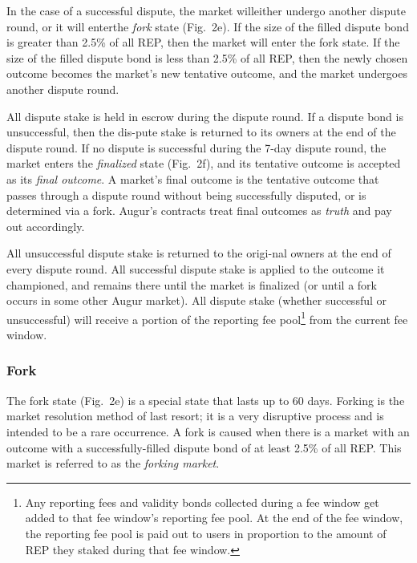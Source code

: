 \documentclass[12pt,floatfix,reprint,nofootinbib,amsmath,amssymb,epsfig,pre,floats,letterpaper,groupedaffiliation]{revtex4-1}
\theoremstyle{definition}
\theoremstyle{definition}
\begin{document}
In the case of a successful dispute, the market will\linebreak either undergo another dispute round, or it will enter\linebreak the \textit{fork} state (Fig.~2e). If the size of the filled dispute bond is greater than 2.5\% of all REP, then the market will enter the fork state. If the size of the filled dispute bond is less than 2.5\% of all REP, then the newly chosen outcome becomes the market's new tentative outcome, and the market undergoes another dispute round.

All dispute stake is held in escrow during the dispute round. If a dispute bond is unsuccessful, then the dis-\linebreak pute stake is returned to its owners at the end of the dispute round. If no dispute is successful during the 7-day dispute round, the market enters the \textit{finalized} state (Fig.~2f), and its tentative outcome is accepted as its \textit{fi\linebreak nal outcome}. A market's final outcome is the tentative outcome that passes through a dispute round without being successfully disputed, or is determined via a fork. Augur's contracts treat final outcomes as \textit{truth} and pay out accordingly.

All unsuccessful dispute stake is returned to the origi-\linebreak nal owners at the end of every dispute round. All success\-ful dispute stake is applied to the outcome it championed, and remains there until the market is finalized (or until a fork occurs in some other Augur market). All dispute stake (whether successful or unsuccessful) will receive a portion of the reporting fee pool\footnote{Any reporting fees and validity bonds collected during a fee window get added to that fee window's reporting fee pool. At the end of the fee window, the reporting fee pool is paid out to users in proportion to the amount of REP they staked during that fee window.} from the current fee window.

\subsubsection{Fork}

The fork state (Fig.~2e) is a special state that lasts up to 60 days. Forking is the market resolution method of last resort; it is a very disruptive process and is intended to be a rare occurrence. A fork is caused when there is a market with an outcome with a successfully-filled dispute bond of at least 2.5\% of all REP. This market is referred to as the \textit{forking market}\pagebreak.
\end{document}
